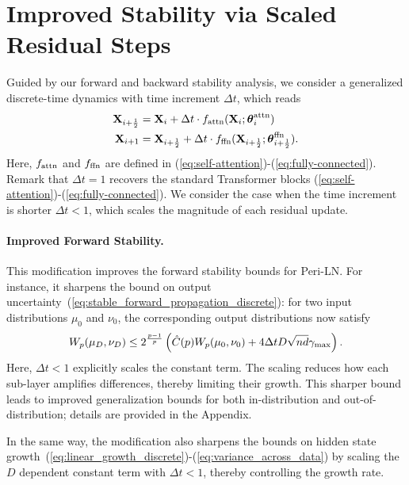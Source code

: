 \documentclass[journal]{IEEEtran}
\def\eqref#1{equation~\ref{#1}}
\newcommand{\bfX}{{\bf X}}
\newcommand{\bftheta}{{\boldsymbol \theta}}
\renewcommand{\eqref}[1]{(\ref{#1})}
\theoremstyle{plain}
\theoremstyle{definition}
\theoremstyle{remark}
\begin{document}
\section{Improved Stability via Scaled Residual Steps}\label{sec:delta_t}
Guided by our forward and backward stability analysis, we consider a generalized discrete-time dynamics with time increment $\Delta t$, which reads
\begin{align*}
     \bfX_{i+\frac{1}{2}} &= \bfX_i + \Delta t \cdot f_{\rm attn}(\bfX_i; \bftheta^{\rm attn}_i) 
     \\
     \bfX_{i+1} &= \bfX_{i+\frac{1}{2}} + \Delta t \cdot f_{\rm ffn}(\bfX_{i+\frac{1}{2}} ;\bftheta^{\rm ffn}_{i+\frac{1}{2}}). 
\end{align*}
Here, $f_{\rm attn}$ and $f_{\rm ffn}$ are defined in \eqref{eq:self-attention}-\eqref{eq:fully-connected}. 
Remark that $\Delta t=1$ recovers the standard Transformer blocks (\ref{eq:self-attention})-(\ref{eq:fully-connected}). We consider the case when the time increment is shorter $\Delta t<1$, which scales the magnitude of each residual update. 

\paragraph{Improved Forward Stability.} 
This modification improves the forward stability bounds for Peri-LN. For instance, it sharpens the bound on output uncertainty~\eqref{eq:stable_forward_propagation_discrete}: for two input distributions $\mu_0$ and $\nu_0$, the corresponding output distributions now satisfy
\begin{equation}\label{eq:forward_stable_improved}
        W_p(\mu_D,\nu_D) \leq 2^{\frac{p-1}{p}} \left( \hat{C}(p)W_p(\mu_0,\nu_0) +4 \Delta t D \sqrt{nd}   \gamma_{\rm max}\right).
    \end{equation}
Here, $\Delta t<1$ explicitly scales the constant term. 
The scaling reduces how each sub-layer amplifies differences, thereby limiting their growth.
This sharper bound leads to improved generalization bounds for both in-distribution and out-of-distribution; details are provided in the Appendix. 

In the same way, the modification also sharpens the bounds on hidden state growth~\eqref{eq:linear_growth_discrete}-\eqref{eq:variance_across_data} by scaling the $D$ dependent constant term with $\Delta t<1$, thereby controlling the growth rate.
\end{document}
